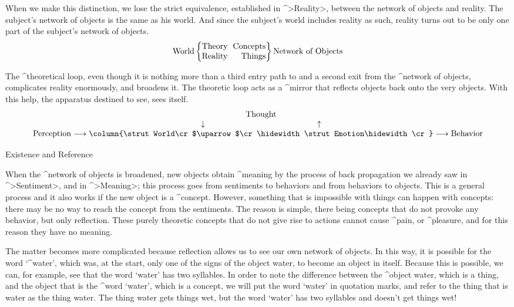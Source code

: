 When we make this distinction, we lose the strict equivalence,
established in ^>Reality>, between the network of objects and reality.
The subject's network of objects is the same as his world. And since the
subject's world includes reality as such, reality turns out to be only
one part of the subject's network of objects.
$$\hbox{World} \left\{ \vcenter{\def\:{\hskip0.65em}\halign{#\cr
    Theory\:\hfil Concepts\cr
    Reality\:\hfil Things\cr} } \right\}
  \hbox{Network of Objects}$$

The ^{theoretical loop}, even though it is nothing more than a third
entry path to and a second exit from the ^{network of objects},
complicates reality enormously, and broadens it. The theoretic loop acts
as a ^{mirror} that reflects objects back onto the very objects. With
this help, the apparatus destined to see, sees itself.
$$\hbox{Perception}\longrightarrow
   \vbox{\everycr={}\tabskip=0pt \lineskip=0pt
    \halign{\hfil\strut#\hfil\cr
     \hidewidth Thought\hidewidth\cr
     $\downarrow$\hfil$\uparrow$\cr
     \column{\strut World\cr$\uparrow$\cr
      \hidewidth\strut Emotion\hidewidth\cr}\cr}}
  \longrightarrow\hbox{Behavior}$$


\Section Existence and Reference

When the ^{network of objects} is broadened, new objects obtain
^{meaning} by the process of back propagation we already saw in
^>Sentiment>, and in ^>Meaning>; this process goes from sentiments to
behaviors and from behaviors to objects. This is a general process and
it also works if the new object is a ^{concept}. However, something that
is impossible with things can happen with concepts: there may be no way
to reach the concept from the sentiments. The reason is simple, there
being concepts that do not provoke any behavior, but only reflection.
These purely theoretic concepts that do not give rise to actions cannot
cause ^{pain}, or ^{pleasure}, and for this reason they have no meaning.

The matter becomes more complicated because reflection allows us to see
our own network of objects. In this way, it is possible for the word
`^{water}', which was, at the start, only one of the signs of the object
water, to become an object in itself. Because this is possible, we can,
for example, see that the word `water' has two syllables. In order to
note the difference between the ^{object} water, which is a thing, and
the object that is the ^{word} `water', which is a concept, we will put
the word `water' in quotation marks, and refer to the thing that is
water as the thing water. The thing water gets things wet, but the word
`water' has two syllables and doesn't get things wet!

